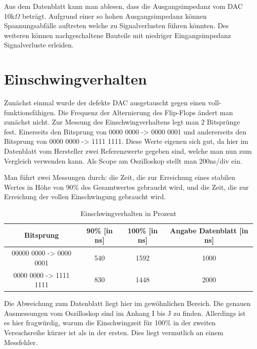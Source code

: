 Aus dem Datenblatt kann man ablesen, dass die Ausgangsimpedanz vom
DAC 10k$\Omega$ beträgt. Aufgrund einer so hohen Ausgangsimpedanz 
können Spannungsabfälle auftreten welche zu Signalverlusten führen 
könnten. Des weiteren können nachgeschaltene Bauteile mit niedriger
Eingangsimpedanz Signalverluste erleiden.




\section{Einschwingverhalten}

Zunächst einmal wurde der defekte DAC ausgetauscht 
gegen einen voll-funktionsfähigen.
Die Frequenz der Alternierung des Flip-Flops ändert man zunächst nicht.
Zur Messung des Einschwingverhaltens legt man 2 Bitsprünge fest.
Einerseits den Bitsprung von 0000 0000 -> 0000 0001 und andererseits 
den Bitsprung von 0000 0000 -> 1111 1111.
Diese Werte eigenen sich gut, da hier im Datenblatt vom Hersteller 
zwei Referenzwerte gegeben sind, welche man nun zum Vergleich verwenden kann.
Als Scope am Oszilloskop stellt man 200ns/div ein. \par
Man führt zwei Messungen durch: die Zeit, die zur Erreichung eines stabilen Wertes
in Höhe von 90\% des Gesamtwertes gebraucht wird, und die Zeit, die zur
Erreichung der vollen Einschwingung gebraucht wird.

\begin{table}[h]
	\centering
	\begin{tabular}[h]{c|c|c|c}
		Bitsprung & 90\% [in ns] & 100\% [in ns] & Angabe Datenblatt [in ns] \\
		\hline
		00000 0000 -> 0000 0001 & 540 & 1592 & 1000\\
		\hline
		0000 0000 -> 1111 1111 & 830 & 1448 & 2000\\
	\end{tabular}
	\caption{Einschwingverhalten in Prozent}
	\label{tab:Einschwingverhalten}
\end{table}

Die Abweichung zum Datenblatt liegt hier im gewöhnlichen Bereich.
Die genauen Ausmessungen vom Oszilloskop sind im Anhang I bis J zu finden.
Allerdings ist es hier fragwürdig, warum die Einschwingzeit für 100\% in der
zweiten Versuchsreihe kürzer ist als in der ersten. Dies liegt vermutlich an
einem Messfehler. 


